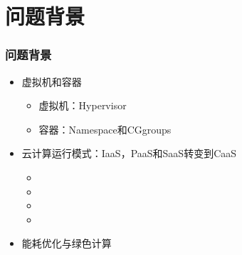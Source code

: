 \section{问题背景}

\begin{frame}
\frametitle{问题背景}
\begin{itemize}
    \item<1-> 虚拟机和容器
    \begin{itemize}
        \item<1-> 虚拟机：Hypervisor
        \item<1-> 容器：Namespace和CGgroups
    \end{itemize}
    \item<2-> 云计算运行模式：IaaS，PaaS和SaaS转变到CaaS
    \begin{itemize}
        \item<2-> \color{green}{容器简单部署和快速可用}
        \item<2-> 
        \item<2-> 
        \item<2-> \color{blue}{\checkmark CaaS性能损耗低}
    \end{itemize}
    \item<3-> 能耗优化与绿色计算
\end{itemize}


\end{frame}
